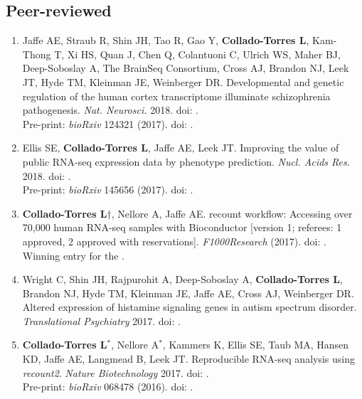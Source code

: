 \subsection{Peer-reviewed}
    \begin{enumerate}
        \item Jaffe AE, Straub R, Shin JH, Tao R, Gao Y, \textbf{Collado-Torres L}, Kam-Thong T, Xi HS, Quan J, Chen Q, Colantuoni C, Ulrich WS, Maher BJ, Deep-Soboslay A, The BrainSeq Consortium, Cross AJ, Brandon NJ, Leek JT, Hyde TM, Kleinman JE, Weinberger DR. Developmental and genetic regulation of the human cortex transcriptome illuminate schizophrenia pathogenesis. \emph{Nat. Neurosci.} 2018. doi: .
        \\ Pre-print: \emph{bioRxiv} 124321 (2017). doi: .
        
        \item Ellis SE, \textbf{Collado-Torres L}, Jaffe AE, Leek JT. Improving the value of public RNA-seq expression data by phenotype prediction. \emph{Nucl. Acids Res.} 2018. doi: .
        \\ Pre-print: \emph{bioRxiv} 145656 (2017). doi: .
        
        \item \textbf{Collado-Torres L}$\dagger$, Nellore A, Jaffe AE. 
        recount workflow: Accessing over 70,000 human RNA-seq samples with Bioconductor [version 1; referees: 1 approved, 2 approved with reservations]. \emph{F1000Research} (2017). doi: .
        \\ Winning entry for the .
        
        \item Wright C, Shin JH, Rajpurohit A, Deep-Soboslay A, \textbf{Collado-Torres L}, Brandon NJ, Hyde TM, Kleinman JE, Jaffe AE, Cross AJ, Weinberger DR. Altered expression of histamine signaling genes in autism spectrum disorder. \emph{Translational Psychiatry} 2017. doi: .
        
        \item \textbf{Collado-Torres L}$^{*}$, Nellore A$^{*}$, Kammers K, Ellis SE, Taub MA, Hansen KD, Jaffe AE, Langmead B, Leek JT. Reproducible RNA-seq analysis using \emph{recount2}. \emph{Nature Biotechnology} 2017. doi: .
        \\ Pre-print: \emph{bioRxiv} 068478 (2016). doi: .
        

\end{enumerate}
